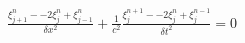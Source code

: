 \documentclass[preview]{standalone}
\begin{document}
\begin{align*}
\frac{\xi_{j+1}^{n} - -2 \xi_{j}^{n} + \xi_{j-1}^{n}}{\delta x^2} + \frac{1}{c^2}\frac{\xi_{j}^{n+1} - -2 \xi_{j}^{n} + \xi_{j}^{n-1}}{\delta t^2}  = 0
\end{align*}
\end{document}
